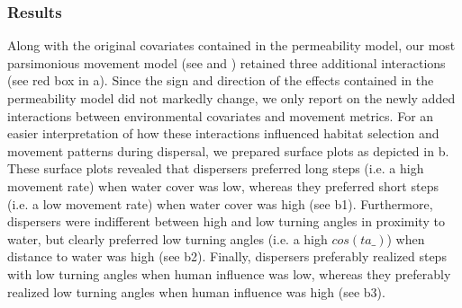 \documentclass[abstract=on,10pt,a4paper,bibliography=totocnumbered]{scrartcl}
\begin{document}
\newpage
\subsubsection{Results}
Along with the original covariates contained in the permeability model, our most
parsimonious movement model (see  and
) retained three additional interactions (see red box
in a). Since the sign and direction of the effects contained
in the permeability model did not markedly change, we only report on the newly
added interactions between environmental covariates and movement metrics. For an
easier interpretation of how these interactions influenced habitat selection and
movement patterns during dispersal, we prepared surface plots as depicted in
b. These surface plots revealed that dispersers preferred
long steps (i.e. a high movement rate) when water cover was low, whereas they
preferred short steps (i.e. a low movement rate) when water cover was high (see
b1). Furthermore, dispersers were indifferent between high
and low turning angles in proximity to water, but clearly preferred low turning
angles (i.e. a high \(cos(ta\_)\)) when distance to water was high (see
b2). Finally, dispersers preferably realized steps with low
turning angles when human influence was low, whereas they preferably realized
low turning angles when human influence was high (see b3).
\end{document}
